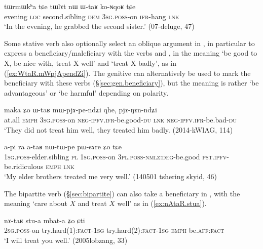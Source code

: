 \begin{exe}
\ex \label{ex:WtaR.koNqoR}
\gll tɯrmɯkʰa tɕe tɯlɤt nɯ ɯ-taʁ ko-ɴqoʁ tɕe \\
evening \textsc{loc} second.sibling \textsc{dem} \textsc{3sg}.\textsc{poss}-on \textsc{ifr}-hang \textsc{lnk} \\
\glt `In the evening, he grabbed the second sister.' (07-deluge, 47)
\end{exe} 

Some stative verb also optionally select an oblique argument in , in particular to express a beneficiary/maleficiary with the verbs  and , in the meaning `be good to X, be nice with, treat X well' and `treat X badly', as in (\ref{ex:WtaR.mWpjApendZi}). The genitive can alternatively be used to mark the beneficiary with these verbs (§\ref{sec:gen.beneficiary}), but the meaning is rather `be advantageous' or `be harmful' depending on polarity.


\begin{exe}
\ex \label{ex:WtaR.mWpjApendZi}
\gll  maka ʑo ɯ-taʁ mɯ-pjɤ-pe-ndʑi qhe, pjɤ-ŋɤn-ndʑi \\
at.all \textsc{emph} \textsc{3sg}.\textsc{poss}-on \textsc{neg}-\textsc{ipfv}.\textsc{ifr}-be.good-\textsc{du} \textsc{lnk} \textsc{neg}-\textsc{ipfv}.\textsc{ifr}-be.bad-\textsc{du} \\
\glt `They did not treat him well, they treated him badly. (2014-kWlAG, 114)
\end{exe}

\begin{exe}
\ex \label{ex:ataR.nWtWpe}
\gll  a-pi ra a-taʁ nɯ-tɯ-pe pɯ-sɤre ʑo tɕe  \\
\textsc{1sg}.\textsc{poss}-elder.sibling \textsc{pl} \textsc{1sg}.\textsc{poss}-on \textsc{3pl}.\textsc{poss}-\textsc{nmlz}:\textsc{deg}-be.good \textsc{pst}.\textsc{ipfv}-be.ridiculous \textsc{emph} \textsc{lnk} \\
\glt `My elder brothers treated me very well.' (140501 tshering skyid, 46)
\end{exe}

The bipartite verb  (§\ref{sec:bipartite}) can also take a beneficiary in , with the meaning `care about $X$ and treat $X$ well' as in (\ref{ex:nAtaR.stua}).

\begin{exe}
\ex \label{ex:nAtaR.stua}
\gll nɤ-taʁ stu-a mbat-a ʑo ɕti\\
\textsc{2sg}.\textsc{poss}-on try.hard(1):\textsc{fact}-\textsc{1sg} try.hard(2):\textsc{fact}-\textsc{1sg} \textsc{emph} be.\textsc{aff}:\textsc{fact}\\
\glt `I will treat you well.' (2005lobzang, 33)
\end{exe}


